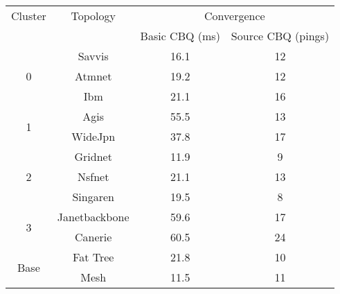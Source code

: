\begin{tabular}{cccc}
\toprule
Cluster & Topology & \multicolumn{2}{c}{Convergence} \\
& & Basic CBQ (ms) & Source CBQ (pings)\\
\midrule
\multirow{3}{*}{0} & Savvis & 16.1 & 12 \\
& Atmnet & 19.2 & 12 \\
& Ibm & 21.1 & 16 \\ \hline
\multirow{2}{*}{1}& Agis & 55.5 & 13 \\
& WideJpn & 37.8 & 17 \\ \hline
\multirow{3}{*}{2}& Gridnet & 11.9 & 9 \\
& Nsfnet & 21.1 & 13 \\
& Singaren & 19.5 & 8 \\ \hline
\multirow{2}{*}{3}& Janetbackbone & 59.6 & 17 \\
& Canerie & 60.5 & 24 \\ \hline
\multirow{2}{*}{Base}& Fat Tree & 21.8 & 10 \\
& Mesh & 11.5 & 11 \\
\bottomrule
\end{tabular}
